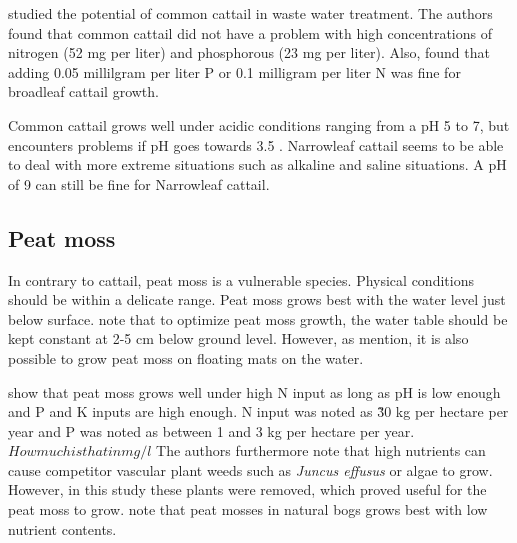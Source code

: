 \documentclass[a4paper,12pt]{scrbook}
\begin{document}
\citet{ciria2005Typha} studied the potential of common cattail in waste water treatment. The authors found that common cattail did not have a problem with high concentrations of nitrogen (52 mg per liter) and phosphorous (23 mg per liter). Also, \citet{newman1996effects} found that adding 0.05 millilgram per liter P or 0.1 milligram per liter N was fine for broadleaf cattail growth.

Common cattail grows well under acidic conditions ranging from a pH 5 to 7, but encounters problems if pH goes towards 3.5 \citep{brix2002typha}. Narrowleaf cattail seems to be able to deal with more extreme situations such as alkaline and saline situations. A pH of 9 can still be fine for Narrowleaf cattail.



\subsection{Peat moss}

In contrary to cattail, peat moss is a vulnerable species. Physical conditions should be within a delicate range. Peat moss grows best with the water level just below surface.  \citet{fritz2014paludicultuur} note that to optimize peat moss growth, the water table should be kept constant at 2-5 cm below ground level. However, as \citet{gaudig2014sphagnum} mention, it is also possible to grow peat moss on floating mats on the water.

\citet{Temmink2017196} show that peat moss grows well under high N input as long as pH is low enough and P and K inputs are high enough. 
N input was noted as \~ 30 kg per hectare per year and P was noted as between 1 and 3 kg per hectare per year.$How much is that in mg/l$ The authors furthermore note that high nutrients can cause competitor vascular plant weeds such as \textit{Juncus effusus} or algae to grow. However, in this study these plants were removed, which proved useful for the peat moss to grow. \citep{wichtmann2016paludiculture} note that peat mosses in natural bogs grows best with low nutrient contents.
\end{document}
